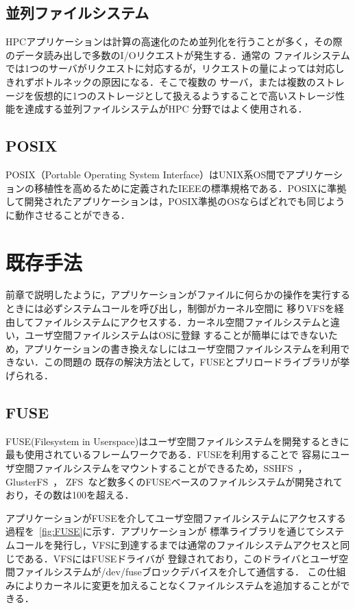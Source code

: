 \documentclass[a4paper，11pt]{jreport}
\begin{document}
\section{並列ファイルシステム}
HPCアプリケーションは計算の高速化のため並列化を行うことが多く，その際のデータ読み出しで多数のI/Oリクエストが発生する．通常の
ファイルシステムでは1つのサーバがリクエストに対応するが，リクエストの量によっては対応しきれずボトルネックの原因になる．そこで複数の
サーバ，または複数のストレージを仮想的に1つのストレージとして扱えるようすることで高いストレージ性能を達成する並列ファイルシステムがHPC
分野ではよく使用される．
\section{POSIX}
POSIX（Portable Operating System Interface）はUNIX系OS間でアプリケーションの移植性を高めるために定義されたIEEEの標準規格である．POSIXに準拠して開発されたアプリケーションは，POSIX準拠のOSならばどれでも同じように動作させることができる．
\chapter{既存手法}
前章で説明したように，アプリケーションがファイルに何らかの操作を実行するときには必ずシステムコールを呼び出し，制御がカーネル空間に
移りVFSを経由してファイルシステムにアクセスする．カーネル空間ファイルシステムと違い，ユーザ空間ファイルシステムはOSに登録
することが簡単にはできないため，アプリケーションの書き換えなしにはユーザ空間ファイルシステムを利用できない．この問題の
既存の解決方法として，FUSEとプリロードライブラリが挙げられる．
\section{FUSE}
FUSE(Filesystem in Userspace)はユーザ空間ファイルシステムを開発するときに最も使用されているフレームワークである．FUSEを利用することで
容易にユーザ空間ファイルシステムをマウントすることができるため，SSHFS~\cite{hoskins2006sshfs}，GlusterFS~\cite{davies2013scale}，
ZFS~\cite{rodeh2003zfs}など数多くのFUSEベースのファイルシステムが開発されており，その数は100を超える．

アプリケーションがFUSEを介してユーザ空間ファイルシステムにアクセスする過程を\figurename~\ref{fig:FUSE}に示す．アプリケーションが
標準ライブラリを通じてシステムコールを発行し，VFSに到達するまでは通常のファイルシステムアクセスと同じである．VFSにはFUSEドライバが
登録されており，このドライバとユーザ空間ファイルシステムが/dev/fuseブロックデバイスを介して通信する．
この仕組みによりカーネルに変更を加えることなくファイルシステムを追加することができる．
\end{document}
